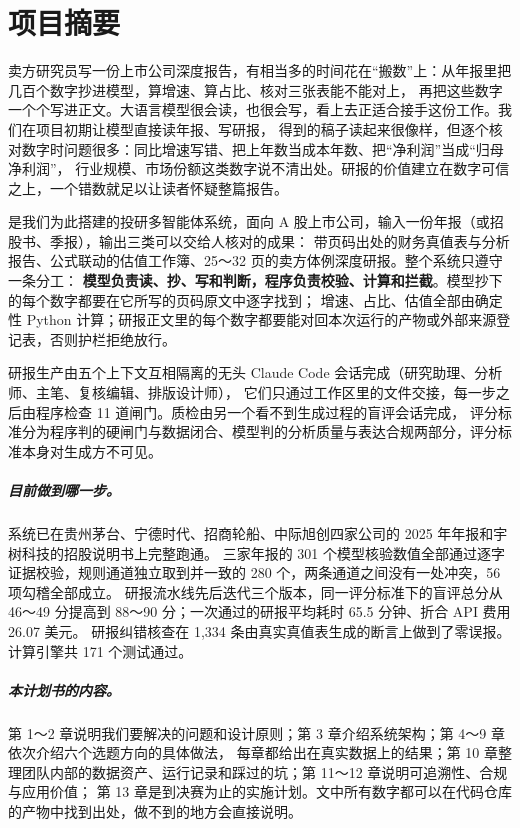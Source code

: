 \renewcommand{\ledgerkicker}{SUMMARY}
\chapter*{项目摘要}

卖方研究员写一份上市公司深度报告，有相当多的时间花在“搬数”上：从年报里把几百个数字抄进模型，算增速、算占比、核对三张表能不能对上，
再把这些数字一个个写进正文。大语言模型很会读，也很会写，看上去正适合接手这份工作。我们在项目初期让模型直接读年报、写研报，
得到的稿子读起来很像样，但逐个核对数字时问题很多：同比增速写错、把上年数当成本年数、把“净利润”当成“归母净利润”，
行业规模、市场份额这类数字说不清出处。研报的价值建立在数字可信之上，一个错数就足以让读者怀疑整篇报告。

\sysname{} 是我们为此搭建的投研多智能体系统，面向 A 股上市公司，输入一份年报（或招股书、季报），输出三类可以交给人核对的成果：
带页码出处的财务真值表与分析报告、公式联动的估值工作簿、25～32 页的卖方体例深度研报。整个系统只遵守一条分工：
\textbf{模型负责读、抄、写和判断，程序负责校验、计算和拦截}。模型抄下的每个数字都要在它所写的页码原文中逐字找到；
增速、占比、估值全部由确定性 Python 计算；研报正文里的每个数字都要能对回本次运行的产物或外部来源登记表，否则护栏拒绝放行。

研报生产由五个上下文互相隔离的无头 Claude Code 会话完成（研究助理、分析师、主笔、复核编辑、排版设计师），
它们只通过工作区里的文件交接，每一步之后由程序检查 11 道闸门。质检由另一个看不到生成过程的盲评会话完成，
评分标准分为程序判的硬闸门与数据闭合、模型判的分析质量与表达合规两部分，评分标准本身对生成方不可见。

\paragraph{目前做到哪一步。}
系统已在贵州茅台、宁德时代、招商轮船、中际旭创四家公司的 2025 年年报和宇树科技的招股说明书上完整跑通。
三家年报的 301 个模型核验数值全部通过逐字证据校验，规则通道独立取到并一致的 280 个，两条通道之间没有一处冲突，56 项勾稽全部成立。
研报流水线先后迭代三个版本，同一评分标准下的盲评总分从 46～49 分提高到 88～90 分；一次通过的研报平均耗时 65.5 分钟、折合 API 费用 26.07 美元。
研报纠错核查在 1,334 条由真实真值表生成的断言上做到了零误报。计算引擎共 171 个测试通过。

\paragraph{本计划书的内容。}
第 1～2 章说明我们要解决的问题和设计原则；第 3 章介绍系统架构；第 4～9 章依次介绍六个选题方向的具体做法，
每章都给出在真实数据上的结果；第 10 章整理团队内部的数据资产、运行记录和踩过的坑；第 11～12 章说明可追溯性、合规与应用价值；
第 13 章是到决赛为止的实施计划。文中所有数字都可以在代码仓库的产物中找到出处，做不到的地方会直接说明。

